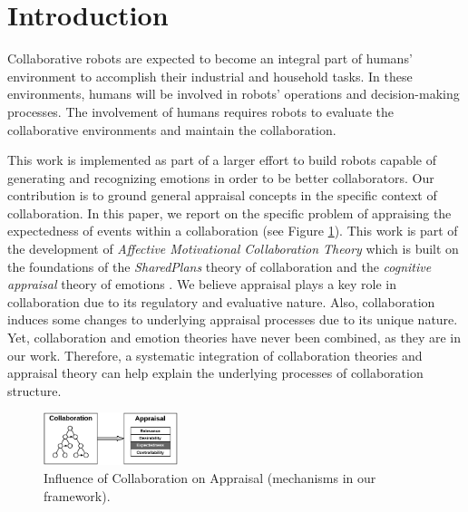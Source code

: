 \documentclass{aamas2016_extendedabstract}
\begin{document}

\section{Introduction}

Collaborative robots are expected to become an integral part of humans'
environment to accomplish their industrial and household tasks. In these
environments, humans will be involved in robots' operations and decision-making
processes. The involvement of humans requires robots to evaluate the
collaborative environments and maintain the collaboration.

This work is implemented as part of a larger effort to build robots capable of
generating and recognizing emotions in order to be better collaborators. Our
contribution is to ground general appraisal concepts in the specific context of
collaboration. In this paper, we report on the specific problem of appraising
the expectedness of events within a collaboration (see Figure \ref{fig:cpm}).
This work is part of the development of \textit{Affective Motivational
Collaboration Theory} \cite{shayganfar:theory-overview} which is built on the
foundations of the \textit{SharedPlans} theory of collaboration
\cite{grosz:plans-discourse} and the \textit{cognitive appraisal} theory of
emotions \cite{gratch:domain-independent}. We believe appraisal plays a key role
in collaboration due to its regulatory and evaluative nature. Also,
collaboration induces some changes to underlying appraisal processes due to its
unique nature. Yet, collaboration and emotion theories have never been combined,
as they are in our work. Therefore, a systematic integration of collaboration
theories and appraisal theory can help explain the underlying processes of
collaboration structure.

\begin{figure}[t]
  \centering
  \includegraphics[width=0.35\textwidth]{figure/actionselection-croped.pdf}
  \vspace*{-3mm}
  \caption{{\fontsize{8}{9}\selectfont Influence of Collaboration on Appraisal
  (mechanisms in our framework).}}
  \label{fig:cpm}
  \vspace*{-5mm}
\end{figure}
\end{document}
